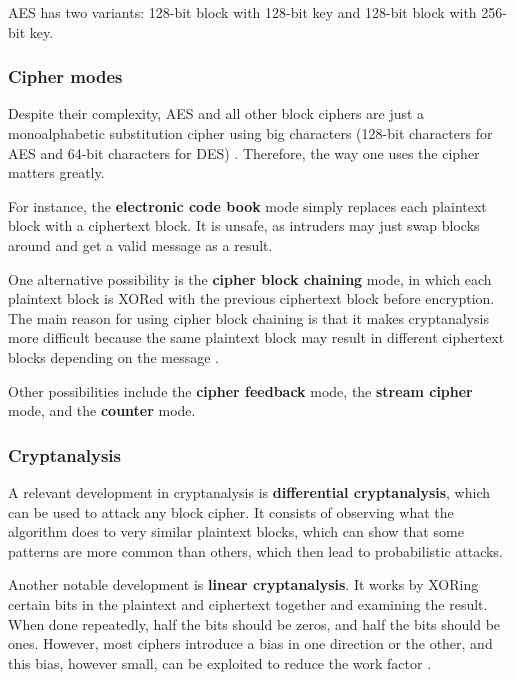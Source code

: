 AES has two variants: 128-bit block with 128-bit key and 128-bit block with 256-bit key.

\subsubsection{Cipher modes}

Despite their complexity, AES and all other block ciphers are just a monoalphabetic substitution cipher using big characters (128-bit characters for AES and 64-bit characters for DES) \cite[p.~787]{computer-networks-tanenbaum-2012}.
Therefore, the way one uses the cipher matters greatly.

For instance, the \textbf{electronic code book} mode simply replaces each plaintext block with a ciphertext block.
It is unsafe, as intruders may just swap blocks around and get a valid message as a result.

One alternative possibility is the \textbf{cipher block chaining} mode, in which each plaintext block is XORed with the previous ciphertext block before encryption.
The main reason for using cipher block chaining is that it makes cryptanalysis more difficult because the same plaintext block may result in different ciphertext blocks depending on the message \cite[p.~789]{computer-networks-tanenbaum-2012}.

Other possibilities include the \textbf{cipher feedback} mode, the \textbf{stream cipher} mode, and the \textbf{counter} mode.

\subsubsection{Cryptanalysis}

A relevant development in cryptanalysis is \textbf{differential cryptanalysis}, which can be used to attack any block cipher.
It consists of observing what the algorithm does to very similar plaintext blocks, which can show that some patterns are more common than others, which then lead to probabilistic attacks.

Another notable development is \textbf{linear cryptanalysis}.
It works by XORing certain bits in the plaintext and ciphertext together and examining the result.
When done repeatedly, half the bits should be zeros, and half the bits should be ones.
However, most ciphers introduce a bias in one direction or the other, and this bias, however small, can be exploited to reduce the work factor \cite[p.~793]{computer-networks-tanenbaum-2012}.

